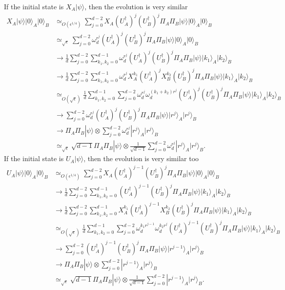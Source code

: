 \documentclass[11pt,letterpaper]{article}
\newcommand{\ket}[1]{|#1\rangle}
\newcommand{\x}{\otimes}
\newcommand{\ct}{^{\dagger}}
\newcommand{\1}{\mathbb{1}}
\newcommand{\appd}[1]{\simeq_{#1}}
\theoremstyle{definition}
\begin{document}
If the initial state is $X_A\ket{\psi}$, then the evolution is very similar 
\begin{align}
	X_A \ket{\psi} \ket{0}_A\ket{0}_B &\appd{O(\epsilon^{1/4})} 
		\sum_{j=0}^{d-2} X_A(U_A\ct)^j (U_B\ct)^j\Pi_A \Pi_B \ket{\psi} \ket{0}_A\ket{0}_B\\
		&\appd{\sqrt{\epsilon}} \sum_{j=0}^{d-2} \omega_d^{r^j}(U_A\ct)^j (U_B\ct)^j\Pi_A \Pi_B \ket{\psi} \ket{0}_A\ket{0}_B\\
		&\to\frac{1}{d}\sum_{j=0}^{d-2} \sum_{k_1,k_2 = 0}^{d-1} \omega_d^{r^j} (U_A\ct)^j (U_B\ct)^j\Pi_A \Pi_B \ket{\psi} \ket{k_1}_A\ket{k_2}_B\\
		&\to\frac{1}{d}\sum_{j=0}^{d-2}\sum_{k_1,k_2 = 0}^{d-1} 
		\omega_d^{r^j} X_A^{k_1}(U_A\ct)^j X_B^{k_2}(U_B\ct)^j\Pi_A \Pi_B\ket{\psi} \ket{k_1}_A\ket{k_2}_B\\
		&\appd{O(\sqrt{\epsilon})} \frac{1}{d}\sum_{k_1,k_2 = 0}^{d-1} \sum_{j=0}^{d-2} \omega_d^{r^j}\omega_d^{(k_1+k_2)r^j}(U_A\ct)^j(U_B\ct)^j\Pi_A \Pi_B \ket{\psi} \ket{k_1}_A\ket{k_2}_B\\
		&\to  \sum_{j=0}^{d-2} \omega_d^{r^j} (U_A\ct)^j(U_B\ct)^j\Pi_A \Pi_B \ket{\psi} \ket{r^j}_A\ket{r^j}_B\\
		&\to  \Pi_A \Pi_B \ket{\psi} \x  \sum_{j=0}^{d-2} \omega_d^{r^j}\ket{r^j}_A\ket{r^j}_B\\
		&\appd{\sqrt{\epsilon}} \sqrt{d-1}\Pi_A \Pi_B \ket{\psi} \x \frac{1}{\sqrt{d-1}} \sum_{j=0}^{d-2} \omega_d^{r^j} \ket{r^j}_A\ket{r^j}_B.
\end{align}
If the initial state is $U_A\ket{\psi}$, then the evolution is very similar too
\begin{align}
	U_A \ket{\psi} \ket{0}_A\ket{0}_B &\appd{O(\epsilon^{1/4})} 
		\sum_{j=0}^{d-2} X_A(U_A\ct)^{j-1} (U_B\ct)^j\Pi_A \Pi_B \ket{\psi} \ket{0}_A\ket{0}_B\\
		&\to\frac{1}{d}\sum_{j=0}^{d-2} \sum_{k_1,k_2 = 0}^{d-1} (U_A\ct)^{j-1} (U_B\ct)^j\Pi_A \Pi_B \ket{\psi} \ket{k_1}_A\ket{k_2}_B\\
		&\to\frac{1}{d}\sum_{j=0}^{d-2}\sum_{k_1,k_2 = 0}^{d-1} 
		X_A^{k_1}(U_A\ct)^{j-1} X_B^{k_2}(U_B\ct)^j\Pi_A \Pi_B\ket{\psi} \ket{k_1}_A\ket{k_2}_B\\
		&\appd{O(\sqrt{\epsilon})} \frac{1}{d}\sum_{k_1,k_2 = 0}^{d-1} \sum_{j=0}^{d-2} \omega_d^{k_1r^{j-1}}\omega_d^{k_2r^j}(U_A\ct)^{j-1}(U_B\ct)^j\Pi_A \Pi_B \ket{\psi} \ket{k_1}_A\ket{k_2}_B\\
		&\to  \sum_{j=0}^{d-2} (U_A\ct)^{j-1}(U_B\ct)^j\Pi_A \Pi_B \ket{\psi} \ket{r^{j-1}}_A\ket{r^j}_B\\
		&\to  \Pi_A \Pi_B \ket{\psi} \x  \sum_{j=0}^{d-2} \ket{r^{j-1}}_A\ket{r^j}_B\\
		&\appd{\sqrt{\epsilon}} \sqrt{d-1}\Pi_A \Pi_B \ket{\psi} \x \frac{1}{\sqrt{d-1}} \sum_{j=0}^{d-2} \ket{r^{j-1}}_A\ket{r^j}_B.
\end{align}
\end{document}
